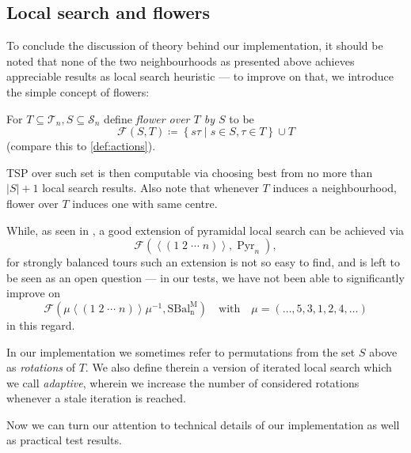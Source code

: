 \documentclass[index=totoc,bibliography=totoc]{scrartcl}
\numberwithin{equation}{section}
\numberwithin{figure}{section}
\numberwithin{table}{section}
\let\defstyle\itshape
\begin{document}
\subsection{Local search and flowers}

To conclude the discussion of theory behind our implementation, it should
be noted that none of the two neighbourhoods as presented above achieves
appreciable results as local search heuristic --- to improve on that, we
introduce the simple concept of flowers:

\begin{define}
  For $T \subseteq \mathcal{T}_n, S \subseteq \mathcal{S}_n$ define
  {\defstyle flower over $T$ by $S$} to be
  \[
    \mathcal{F}\left(S,T\right) \coloneqq
    \left\{ s \tau \mid s \in S, \tau \in T\right\} \cup T
  \]
  (compare this to \cref{def:actions}).
\end{define}

TSP over such set is then computable via choosing best from no
more than $\left|S\right|+1$ local search results.  Also note that whenever
$T$ induces a neighbourhood, flower over $T$ induces one with same centre.

While, as seen in \cite{belperm}, a good extension of pyramidal local
search can be achieved via
\[
  \mathcal{F}\left(
    \left<\left( 1\;2\;\cdots\;n\right)\right>,
    \operatorname{Pyr}_n
  \right),
\]
for strongly balanced tours such an extension is not so easy to find,
and is left to be seen as an open question ---
in our tests, we have not been able to significantly improve on
\[
  \mathcal{F}\left(
  \mu
  \left<\left( 1\;2\;\cdots\;n\right)\right>
    \mu^{-1},
    \operatorname{SBal_n^M}
  \right)
  \quad \text{with} \quad
  \mu = \left(\ldots , 5, 3, 1, 2, 4, \ldots\right)
\]
in this regard.

In our implementation we sometimes refer to permutations from the set $S$ above
as {\defstyle rotations} of $T$.
We also define therein a version of iterated local search which we call
{\defstyle adaptive}, wherein we increase the number of considered rotations
whenever a stale iteration is reached.

Now we can turn our attention to technical details of our implementation
as well as practical test results.
\end{document}
